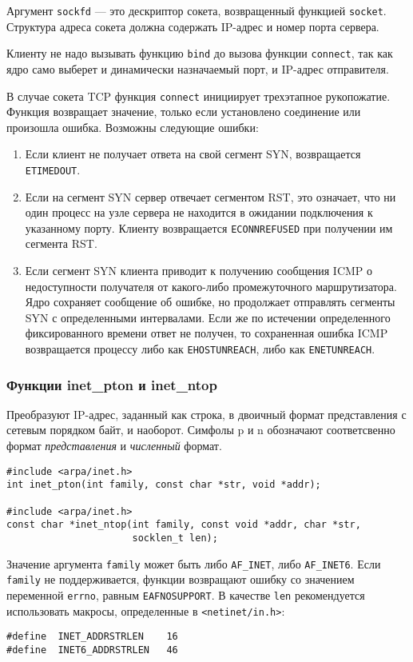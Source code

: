 Аргумент \lstinline{sockfd} --- это дескриптор сокета, возвращенный функцией \lstinline{socket}. Структура адреса сокета должна содержать IP-адрес и номер порта сервера.

Клиенту не надо вызывать функцию \lstinline{bind} до вызова функции \lstinline{connect}, так как ядро само выберет и динамически назначаемый порт, и IP-адрес отправителя.

В случае сокета TCP функция \lstinline{connect} инициирует трехэтапное рукопожатие. Функция возвращает значение, только если установлено соединение или произошла ошибка. Возможны следующие ошибки:
\begin{enumerate}
  \item Если клиент не получает ответа на свой сегмент SYN, возвращается \lstinline{ETIMEDOUT}.
  \item Если на сегмент SYN сервер отвечает сегментом RST, это означает, что ни один процесс на узле сервера не находится в ожидании подключения к указанному порту. Клиенту возвращается \lstinline{ECONNREFUSED} при получении им сегмента RST.
  \item Если сегмент SYN клиента приводит к получению сообщения ICMP о недоступности получателя от какого-либо промежуточного маршрутизатора. Ядро сохраняет сообщение об ошибке, но продолжает отправлять сегменты SYN с определенными интервалами. Если же по истечении определенного фиксированного времени ответ не получен, то сохраненная ошибка ICMP возвращается процессу либо как \lstinline{EHOSTUNREACH}, либо как \lstinline{ENETUNREACH}.
\end{enumerate}

\subsubsection{Функции inet\_pton и inet\_ntop}
Преобразуют IP-адрес, заданный как строка, в двоичный формат представления с сетевым порядком байт, и наоборот. Симфолы p и n обозначают соответсвенно формат \emph{представления} и \emph{численный} формат.
\lstset{language=C,caption=}
\begin{lstlisting}
#include <arpa/inet.h>
int inet_pton(int family, const char *str, void *addr);

#include <arpa/inet.h>
const char *inet_ntop(int family, const void *addr, char *str,
                      socklen_t len);
\end{lstlisting}

Значение аргумента \lstinline{family} может быть либо \lstinline{AF_INET}, либо \lstinline{AF_INET6}. Если \lstinline{family} не поддерживается, функции возвращают ошибку со значением переменной \lstinline{errno}, равным \lstinline{EAFNOSUPPORT}. В качестве \lstinline{len} рекомендуется использовать макросы, определенные в \lstinline{<netinet/in.h>}:
\lstset{language=C,caption=}
\begin{lstlisting}
#define  INET_ADDRSTRLEN    16
#define  INET6_ADDRSTRLEN   46
\end{lstlisting}

